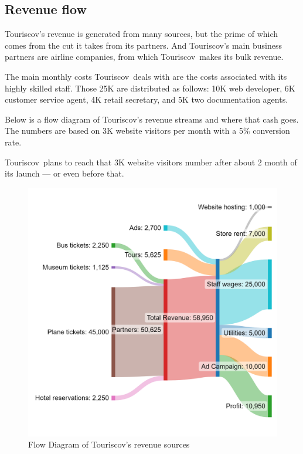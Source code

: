 \documentclass[12pt]{article}
\newcommand{\tco}{Touriscov}
\begin{document}
\subsection{Revenue flow}
Touriscov's revenue is generated from many sources, but the prime of which comes from the cut it takes from its partners. And Touriscov's main business partners are airline companies, from which \tco\ makes its bulk revenue.\ \par

\noindent
The main monthly costs \tco\ deals with are the costs associated with its highly skilled staff. Those 25K are distributed as follows: 10K web developer, 6K customer service agent, 4K retail secretary, and 5K two documentation agents.\ \par
\vspace{2em}
\noindent
Below is a flow diagram of Touriscov's revenue streams and where that cash goes. The numbers are based on 3K website visitors per month with a 5\% conversion rate.\ \par

\noindent
\tco\ plans to reach that 3K website visitors number after about 2 month of its launch --- or even before that.\ \par


\begin{figure}[h]
    \centering
    \includegraphics[scale=0.16]{newRevStreamsFlowDiagram.png}
    \caption{Flow Diagram of Touriscov's revenue sources}
\end{figure}
\end{document}
